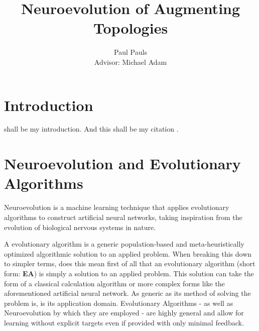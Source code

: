 \documentclass[journal, a4paper]{IEEEtran}
\begin{document}
\title{Neuroevolution of Augmenting Topologies}
\author{Paul Pauls\\
        Advisor: Michael Adam}
\maketitle


\tableofcontents

\begin{abstract}
    \blindtext
\end{abstract}


\section{Introduction}

 shall be my introduction. And this shall be my citation \cite{cite01}.
\blindtext




\section{Neuroevolution and Evolutionary Algorithms}
Neuroevolution is a machine learning technique that applies evolutionary algorithms to construct artificial neural networks, taking inspiration from the evolution of biological nervous systems in nature. \cite{cite02}

A evolutionary algorithm is a generic population-based and meta-heuristically optimized algorithmic solution to an applied problem. When breaking this down to simpler terms, does this mean first of all that an evolutionary algorithm (short form: \textbf{EA}) is simply a solution to an applied problem. This solution can take the form of a classical calculation algorithm or more complex forms like the aforementioned artificial neural network. As generic as its method of solving the problem is, is its application domain. Evolutionary Algorithms - as well as Neuroevolution by which they are employed - are highly general and allow for learning without explicit targets even if provided with only minimal feedback. \cite{cite02}
\end{document}
